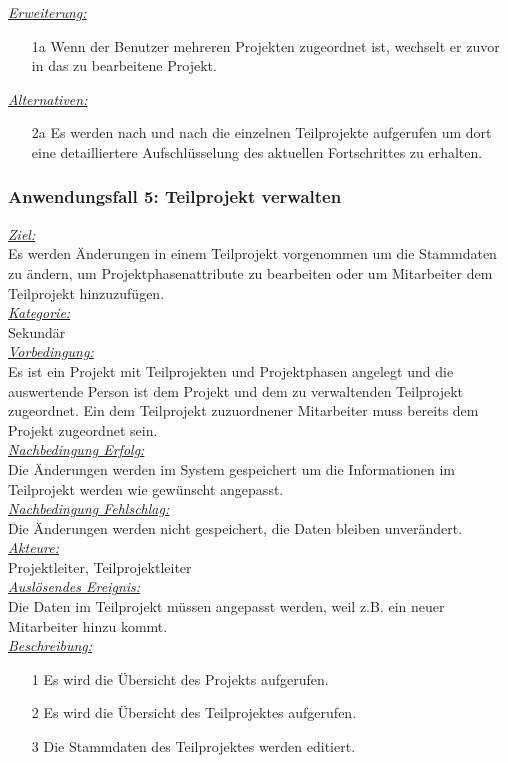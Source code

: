 \underline{\emph{Erweiterung:}}
\begin{itemize}
    \item [1a] Wenn der Benutzer mehreren Projekten zugeordnet ist, wechselt er zuvor in das zu bearbeitene Projekt.
\end{itemize}
\underline{\emph{Alternativen:}}
\begin{itemize}
    \item [2a] Es werden nach und nach die einzelnen Teilprojekte aufgerufen um dort eine detailliertere Aufschlüsselung des aktuellen Fortschrittes zu erhalten.
\end{itemize}

\subsubsection{Anwendungsfall 5: Teilprojekt verwalten}
\underline{\emph{Ziel:}}\\
Es werden Änderungen in einem Teilprojekt vorgenommen um die Stammdaten zu ändern, um Projektphasenattribute zu bearbeiten oder um Mitarbeiter dem Teilprojekt hinzuzufügen.\\
\underline{\emph{Kategorie:}} \\
Sekundär\\
\underline{\emph{Vorbedingung:}} \\
Es ist ein Projekt mit Teilprojekten und Projektphasen angelegt und die auswertende Person ist dem Projekt und dem zu verwaltenden Teilprojekt zugeordnet. Ein dem Teilprojekt zuzuordnener Mitarbeiter muss bereits dem Projekt zugeordnet sein.\\
\underline{\emph{Nachbedingung Erfolg:}} \\
Die Änderungen werden im System gespeichert um die Informationen im Teilprojekt werden wie gewünscht angepasst.\\
\underline{\emph{Nachbedingung Fehlschlag:}} \\
Die Änderungen werden nicht gespeichert, die Daten bleiben unverändert.\\
\underline{\emph{Akteure:}} \\
Projektleiter, Teilprojektleiter\\
\underline{\emph{Auslösendes Ereignis:}}\\
Die Daten im Teilprojekt müssen angepasst werden, weil z.B. ein neuer Mitarbeiter hinzu kommt.\\
\underline{\emph{Beschreibung:}} 
\begin{itemize}
    \item [1] Es wird die Übersicht des Projekts aufgerufen.
    \item [2] Es wird die Übersicht des Teilprojektes aufgerufen.
    \item [3] Die Stammdaten des Teilprojektes werden editiert.
\end{itemize}
